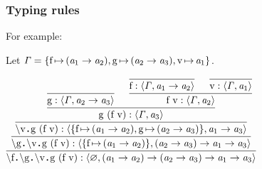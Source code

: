 \documentclass[12pt,red]{beamer}
\begin{document}
\begin{frame}
  \frametitle{Typing rules}

  For example:

  \vspace{0.1in}

  Let
  $\mathit{\Gamma}
  =\{
  \mbox{f}\,{\mapsto}\,(\mathit{a}_1\rightarrow\mathit{a}_2),
  \mbox{g}\,{\mapsto}\,(\mathit{a}_2\rightarrow\mathit{a}_3),
  \mbox{v}\,{\mapsto}\,\mathit{a}_1
  \}$.

  \begin{center}
    $\infer[]
    {\MEMtyping
      {\CONSlamexp
        {\mbox{f}}
        {\CONSlamexp
          {\mbox{g}}
          {\CONSlamexp
            {\mbox{v}}
            {\CONSappexp{\mbox{g}}{(\CONSappexp{\mbox{f}}{\mbox{v}})}}
          }
        }
      }
      {\emptyset}
      {\CONSarrowty
        {(\CONSarrowtyp{\METAtyvar_1}{\METAtyvar_2})}
        {\CONSarrowty
          {(\CONSarrowtyp{\METAtyvar_2}{\METAtyvar_3})}
          {\CONSarrowty
            {\METAtyvar_1}
            {\METAtyvar_3}
          }
        }
      }
    }
    {\infer[]
      {\MEMtyping
        {\CONSlamexp
          {\mbox{g}}
          {\CONSlamexp
            {\mbox{v}}
            {\CONSappexp{\mbox{g}}{(\CONSappexp{\mbox{f}}{\mbox{v}})}}
          }
        }
        {\{\asgn{\mbox{f}}{(\CONSarrowtyp{\METAtyvar_1}{\METAtyvar_2})}\}}
        {\CONSarrowty
          {(\CONSarrowtyp{\METAtyvar_2}{\METAtyvar_3})}
          {\CONSarrowty
            {\METAtyvar_1}
            {\METAtyvar_3}
          }
        }
      }
      {\infer[]
        {\MEMtyping
          {\CONSlamexp
            {\mbox{v}}
            {\CONSappexp{\mbox{g}}{(\CONSappexp{\mbox{f}}{\mbox{v}})}}
          }
          {
            \{
            \asgn{\mbox{f}}{(\CONSarrowtyp{\METAtyvar_1}{\METAtyvar_2})},
            \asgn{\mbox{g}}{(\CONSarrowtyp{\METAtyvar_2}{\METAtyvar_3})}
            \}
          }
          {\CONSarrowty
            {\METAtyvar_1}
            {\METAtyvar_3}
          }
        }
        {\infer[]
          {\MEMtyping
            {\CONSappexp{\mbox{g}}{(\CONSappexp{\mbox{f}}{\mbox{v}})}}
            {\METAityenv}
            {\METAtyvar_3}
          }
          {\infer[]
            {\MEMtyping
              {\mbox{g}}
              {\METAityenv}
              {\CONSarrowtyp{\METAtyvar_2}{\METAtyvar_3}}
            }
            {}
            &\infer[]
            {\MEMtyping
              {\CONSappexp{\mbox{f}}{\mbox{v}}}
              {\METAityenv}
              {\METAtyvar_2}
            }
            {\infer[]
              {\MEMtyping
                {\mbox{f}}
                {\METAityenv}
                {\CONSarrowtyp{\METAtyvar_1}{\METAtyvar_2}}
              }
              {}
              &\infer[]
              {\MEMtyping
                {\mbox{v}}
                {\METAityenv}
                {\METAtyvar_1}
              }
              {}
            }
          }
        }
      }
    }$
  \end{center}
\end{frame}
\end{document}
